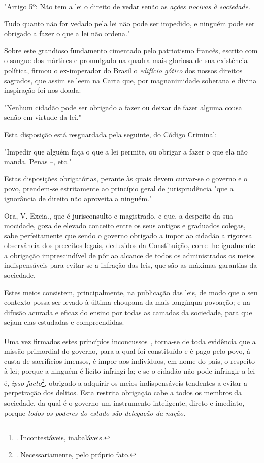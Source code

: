 "Artigo 5º: Não tem a lei o direito de vedar senão as \emph{ações
nocivas à sociedade}.

Tudo quanto não for vedado pela lei não pode ser impedido, e ninguém
pode ser obrigado a fazer o que a lei não ordena."

Sobre este grandioso fundamento cimentado pelo patriotismo francês,
escrito com o sangue dos mártires e promulgado na quadra mais gloriosa
de sua existência política, firmou o ex-imperador do Brasil o
\emph{edifício gótico} dos nossos direitos sagrados, que assim se leem
na Carta que, por magnanimidade soberana e divina inspiração foi-nos
doada:

"Nenhum cidadão pode ser obrigado a fazer ou deixar de fazer alguma
cousa senão em virtude da lei."

Esta disposição está resguardada pela seguinte, do Código Criminal:

"Impedir que alguém faça o que a lei permite, ou obrigar a fazer o que
ela não manda. Penas --, etc."

Estas disposições obrigatórias, perante às quais devem curvar-se o
governo e o povo, prendem-se estritamente ao princípio geral de
jurisprudência "que a ignorância de direito não aproveita a ninguém."

Ora, V. Excia., que é jurisconsulto e magistrado, e que, a despeito da
sua mocidade, goza de elevado conceito entre os seus antigos e graduados
colegas, sabe perfeitamente que sendo o governo obrigado a impor ao
cidadão a rigorosa observância dos preceitos legais, deduzidos da
Constituição, corre-lhe igualmente a obrigação imprescindível de pôr ao
alcance de todos os administrados os meios indispensáveis para evitar-se
a infração das leis, que são as máximas garantias da sociedade.

Estes meios consistem, principalmente, na publicação das leis, de modo
que o seu contexto possa ser levado à última choupana da mais longínqua
povoação; e na difusão acurada e eficaz do ensino por todas as camadas
da sociedade, para que sejam elas estudadas e compreendidas.

Uma vez firmados estes princípios inconcussos\footnote{. Incontestáveis,
  inabaláveis.}, torna-se de toda evidência que a missão primordial do
governo, para a qual foi constituído e é pago pelo povo, à custa de
sacrifícios imensos, é impor aos indivíduos, em nome do país, o respeito
à lei; porque a ninguém é lícito infringi-la; e se o cidadão não pode
infringir a lei é, \emph{ipso facto}\footnote{. Necessariamente, pelo
  próprio fato.}, obrigado a adquirir os meios indispensáveis tendentes
a evitar a perpetração dos delitos. Esta restrita obrigação cabe a todos
os membros da sociedade, da qual é o governo um instrumento inteligente,
direto e imediato, porque \emph{todos os poderes do estado são delegação
da nação}.

